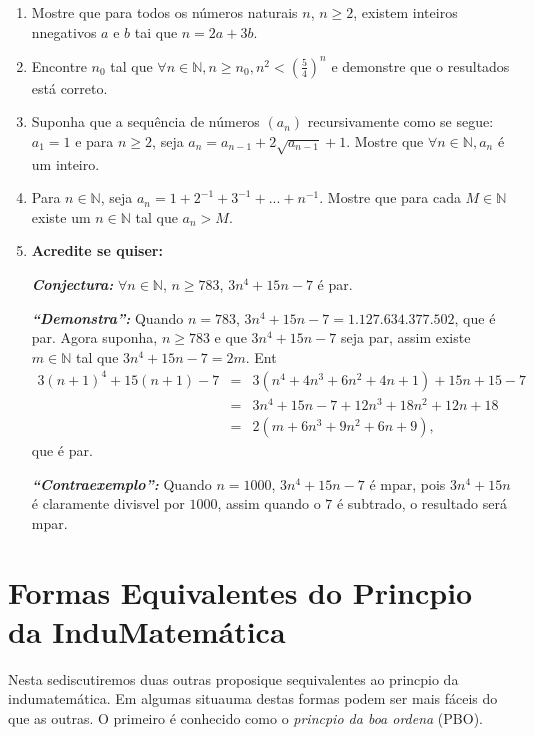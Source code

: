\begin{enumerate}[{\bf 1.}]
\item Mostre que para todos os n\'umeros naturais $n$, $n\geq 2$, existem inteiros n\ao negativos $a$ e $b$ tai que $n=2a+3b$.

\item Encontre $n_0$ tal que $\forall n\in\mathbb{N}, n\geq n_0, n^2<(\frac{5}{4})^n$ e demonstre que o resultados est\'a correto.

\item Suponha que a sequ\^encia de n\'umeros $(a_n)$ recursivamente como se segue: $a_1=1$ e para $n\geq 2$, seja $a_n=a_{n-1}+2\sqrt{a_{n-1}}+1$. Mostre que $\forall n\in\mathbb{N}, a_n$ \'e um inteiro.

\item Para $n\in\mathbb{N}$, seja $a_n=1+2^{-1}+3^{-1}+...+n^{-1}$. Mostre que para cada $M\in\mathbb{N}$ existe um $n\in\mathbb{N}$ tal que $a_n>M$.

\item {\bf Acredite se quiser:}  

\noindent \textit{\textbf{Conjectura:}} $\forall n\in\mathbb{N}$, $n\geq 783$, $3n^4+15n-7$ \'e par.

\noindent \textit{\textbf{``Demonstra\caoi'':}} Quando $n=783$, $3n^4+15n-7=1.127.634.377.502$, que \'e par. Agora suponha, $n\geq 783$ e que $3n^4+15n-7$ seja par, assim existe $m\in\mathbb{N}$ tal que $3n^4+15n-7=2m$. Ent\ao
\begin{eqnarray*}
3(n+1)^4+15(n+1)-7&=& 3(n^4+4n^3+6n^2+4n+1)+15n+15-7\\
                  &=& 3n^4+15n-7+12n^3+18n^2+12n+18 \\
                  &=& 2(m+6n^3+9n^2+6n+9),
\end{eqnarray*}  
que \'e par.   

\noindent \textit{\textbf{``Contraexemplo'':}} Quando $n=1000$, $3n^4+15n-7$ \'e \ih mpar, pois $3n^4+15n$ \'e claramente divis\ih vel por $1000$, assim quando o $7$ \'e subtra\ih do, o resultado ser\'a \ih mpar.
\end{enumerate}

\section{Formas Equivalentes do Princ\ih pio da Indu\cao Matem\'atica}\label{eqvinducao}

Nesta se\cao discutiremos duas outras proposi\coes que s\ao equivalentes ao princ\ih pio da indu\cao matem\'atica. Em algumas situa\coes uma destas formas podem ser mais f\'aceis do que as outras. O primeiro \'e conhecido como o {\it princ\ih pio da boa ordena\cao} (PBO).
\\
\\

